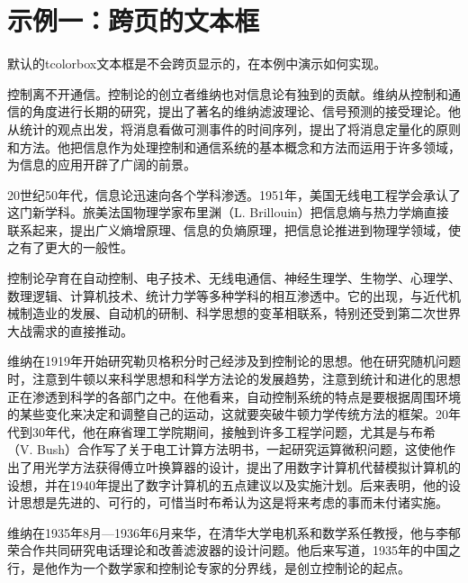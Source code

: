 \documentclass[oneside]{article}
\begin{document}
\section{示例一：跨页的文本框}
默认的tcolorbox文本框是不会跨页显示的，在本例中演示如何实现。

\begin{tcolorbox}[
    colback=GhostWhite,%
    fontupper=\fontsize{1em}{2ex},%
    colframe=LightGray,%
    coltitle=black,%
    title=测试列表,%
    fonttitle=\bfseries\Large,%
    bottomrule=3ex,%
    breakable=true%
  ]
  \setlength{\parindent}{2em}%
  \setlength{\parskip}{2ex} %

  控制离不开通信。控制论的创立者维纳也对信息论有独到的贡献。维纳从控制和通信的角度进行长期的研究，提出了著名的维纳滤波理论、信号预测的接受理论。他从统计的观点出发，将消息看做可测事件的时间序列，提出了将消息定量化的原则和方法。他把信息作为处理控制和通信系统的基本概念和方法而运用于许多领域，为信息的应用开辟了广阔的前景。

  20世纪50年代，信息论迅速向各个学科渗透。1951年，美国无线电工程学会承认了这门新学科。旅美法国物理学家布里渊（L. Brillouin）把信息熵与热力学熵直接联系起来，提出广义熵增原理、信息的负熵原理，把信息论推进到物理学领域，使之有了更大的一般性。

  控制论孕育在自动控制、电子技术、无线电通信、神经生理学、生物学、心理学、数理逻辑、计算机技术、统计力学等多种学科的相互渗透中。它的出现，与近代机械制造业的发展、自动机的研制、科学思想的变革相联系，特别还受到第二次世界大战需求的直接推动。

  维纳在1919年开始研究勒贝格积分时己经涉及到控制论的思想。他在研究随机问题时，注意到牛顿以来科学思想和科学方法论的发展趋势，注意到统计和进化的思想正在渗透到科学的各部门之中。在他看来，自动控制系统的特点是要根据周围环境的某些变化来决定和调整自己的运动，这就要突破牛顿力学传统方法的框架。20年代到30年代，他在麻省理工学院期间，接触到许多工程学问题，尤其是与布希（V. Bush）合作写了关于电工计算方法明书，一起研究运算微积问题，这使他作出了用光学方法获得傅立叶换算器的设计，提出了用数字计算机代替模拟计算机的设想，并在1940年提出了数字计算机的五点建议以及实施汁划。后来表明，他的设计思想是先进的、可行的，可惜当时布希认为这是将来考虑的事而未付诸实施。

  维纳在1935年8月—1936年6月来华，在清华大学电机系和数学系任教授，他与李郁荣合作共同研究电话理论和改善滤波器的设计问题。他后来写道，1935年的中国之行，是他作为一个数学家和控制论专家的分界线，是创立控制论的起点。


\end{tcolorbox}
\end{document}
